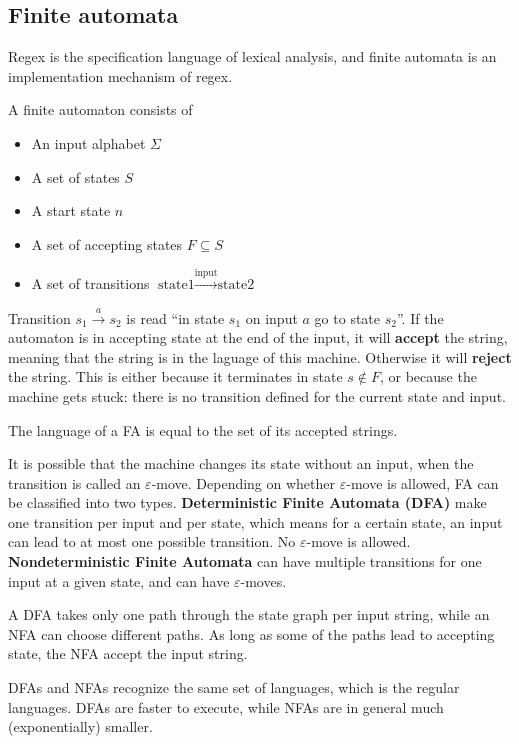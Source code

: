 \subsection{Finite automata}
Regex is the specification language of lexical analysis, and finite automata is an implementation mechanism of regex.

A finite automaton consists of
\begin{itemize}
\item An input alphabet $\Sigma$
\item A set of states $S$
\item A start state $n$
\item A set of accepting states $F\subseteq S$
\item A set of transitions $\text{state1}\xrightarrow{\text{input}}\text{state2}$
\end{itemize}
Transition $s_1\xrightarrow{a}s_2$ is read ``in state $s_1$ on input $a$ go to state $s_2$''. If the automaton is in accepting state at the end of the input, it will {\bf accept} the string, meaning that the string is in the laguage of this machine. Otherwise it will {\bf reject} the string. This is either because it terminates in state $s\notin F$, or because the machine gets stuck: there is no transition defined for the current state and input.

The language of a FA is equal to the set of its accepted strings.

It is possible that the machine changes its state without an input, when the transition is called an $\varepsilon $-move. Depending on whether $\varepsilon$-move is allowed, FA can be classified into two types. {\bf Deterministic Finite Automata (DFA)} make one transition per input and per state, which means for a certain state, an input can lead to at most one possible transition. No $\varepsilon$-move is allowed. {\bf Nondeterministic Finite Automata} can have multiple transitions for one input at a given state, and can have $\varepsilon$-moves.

A DFA takes only one path through the state graph per input string, while an NFA can choose different paths. As long as some of the paths lead to accepting state, the NFA accept the input string.

DFAs and NFAs recognize the same set of languages, which is the regular languages. DFAs are faster to execute, while NFAs are in general much (exponentially) smaller.
